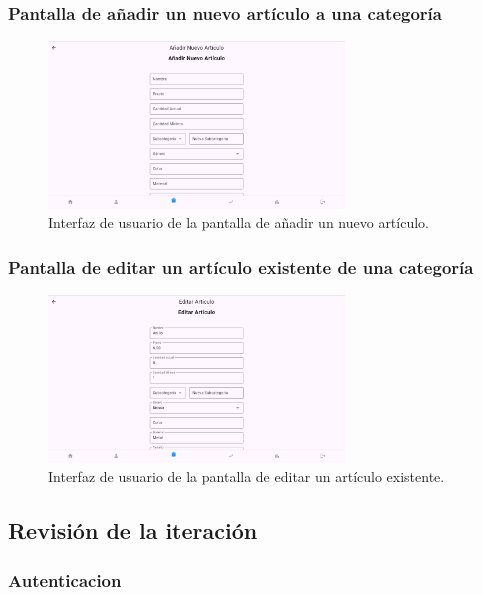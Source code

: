 \subsubsection{Pantalla de añadir un nuevo artículo a una categoría}

\begin{figure}[H]
	\centering
	\includegraphics[width=0.7\textwidth]{imagenes/PrimeraIteracion/nuevoArticulo.png}
	\caption{Interfaz de usuario de la pantalla de añadir un nuevo artículo.}
	\label{fig:appNuevoArticulo}
\end{figure}

\subsubsection{Pantalla de editar un artículo existente de una categoría}

\begin{figure}[H]
	\centering
	\includegraphics[width=0.7\textwidth]{imagenes/PrimeraIteracion/editarArticulo.png}
	\caption{Interfaz de usuario de la pantalla de editar un artículo existente.}
	\label{fig:appEditarArticulo}
\end{figure}


\subsection{Revisión de la iteración}

\subsubsection{Autenticacion}

